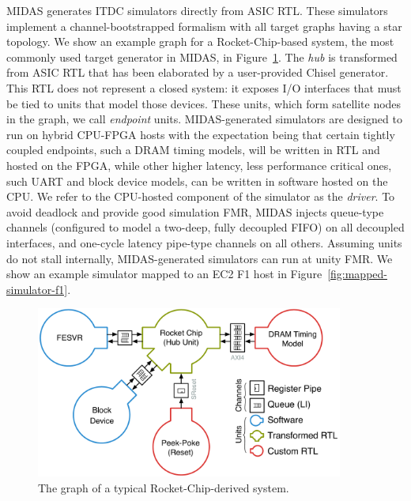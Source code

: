 MIDAS generates ITDC simulators directly from ASIC RTL. These simulators
implement a channel-bootstrapped formalism with all target graphs having a
star topology. We show an example graph for a Rocket-Chip-based system, the
most commonly used target generator in MIDAS, in Figure~\ref{fig:rocket-target-graph}.
The \emph{hub} is transformed from ASIC RTL that has been elaborated by a user-provided Chisel
generator. This RTL does not represent a
closed system: it exposes I/O interfaces that must be tied to units that model those
devices. These units, which form satellite nodes in the graph, we call \emph{endpoint} units.
MIDAS-generated simulators are designed to run on hybrid CPU-FPGA hosts
with the expectation being that certain tightly coupled endpoints, such a DRAM
timing models, will be written in RTL and hosted on the FPGA, while other higher
latency, less performance critical ones, such UART and block device models, can
be written in software hosted on the CPU. We refer to the CPU-hosted component
of the simulator as the \emph{driver}. To avoid deadlock and provide good
simulation FMR, MIDAS injects queue-type channels (configured to model a two-deep,
fully decoupled FIFO) on all decoupled interfaces, and one-cycle latency
pipe-type channels on all others. Assuming units do not stall internally, MIDAS-generated
simulators can run at unity FMR. We show an example simulator mapped to an EC2 F1 host in Figure~\ref{fig:mapped-simulator-f1}.

\begin{figure}
    \centering
    \includegraphics[width=0.9\textwidth]{figures/rocket-target-graph.pdf}
    \caption{The graph of a typical Rocket-Chip-derived system.}
    \label{fig:rocket-target-graph}
\end{figure}

